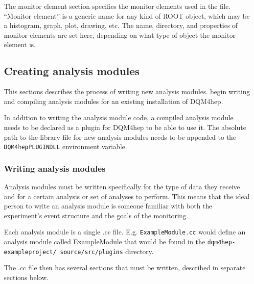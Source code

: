 The monitor element section specifies the monitor elements used in the file. ``Monitor element'' is a generic name for any kind of ROOT object, which may be a histogram, graph, plot, drawing, etc. The name, directory, and properties of monitor elements are set here, depending on what type of object the monitor element is.

\subsection{Creating analysis modules}


This sections describes the process of writing new analysis modules. begin writing and compiling analysis modules for an existing installation of \acrshort{DQM4hep}. 

In addition to writing the analysis module code, a compiled analysis module needs to be declared as a plugin for \acrshort{DQM4hep} to be able to use it. The absolute path to the library file for new analysis modules needs to be appended to the \texttt{DQM4hep\textunderscore PLUGIN\textunderscore DLL} environment variable. 

\subsubsection{Writing analysis modules}
Analysis modules must be written specifically for the type of data they receive and for a certain analysis or set of analyses to perform. This means that the ideal person to write an analysis module is someone familiar with both the experiment's event structure and the goals of the monitoring.

Each analysis module is a single .cc file. E.g. \texttt{ExampleModule.cc} would define an analysis module called ExampleModule that would be found in the \texttt{dqm4hep-exampleproject/ source/src/plugins} directory.

The .cc file then has several sections that must be written, described in separate sections below.

